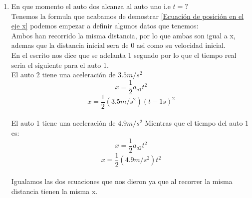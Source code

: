 \documentclass[letterpaper, 12pt]{article}
\begin{document}
\begin{enumerate}
\begin{enumerate}
    \item {En que momento el auto dos alcanza al auto uno i.e $t=?$}\\
Tenemos la formula que acabamos de demostrar \ref{Ecuación de posición en el eje x} podemos empezar a definir algunos datos que tenemos:\\
Ambos han recorrido la misma distancia, por lo que ambas son igual a x, ademas que la distancia inicial sera de 0 asi como su velocidad inicial.\\
En el escrito nos dice que se adelanta 1 segundo por lo que el tiempo real seria el siguiente para el auto 1.\\
El auto 2 tiene una aceleración de $3.5m/s^2$
\begin{equation}
\label{Ecuacion inciso a auto 1}
    x= \frac{1}{2} a_{a1} t^2 
\end{equation}
\begin{equation}
\label{Ecuación inciso a auto 2}
     x= \frac{1}{2} (3.5 m/s^2)(t-1s)^2 
\end{equation}
\\
El auto 1 tiene una aceleración de $4.9m/s^2$
Mientras que el tiempo del auto 1 es:\\
\begin{equation}
    x = \frac{1}{2} a_{a2}t^2
\end{equation}
\begin{equation}
    x = \frac{1}{2} (4.9 m/s^2)t^2
\end{equation}
\\
Igualamos las dos ecuaciones que nos dieron ya que al recorrer la misma distancia tienen la misma x.


\end{enumerate}
\end{enumerate}
\end{document}
